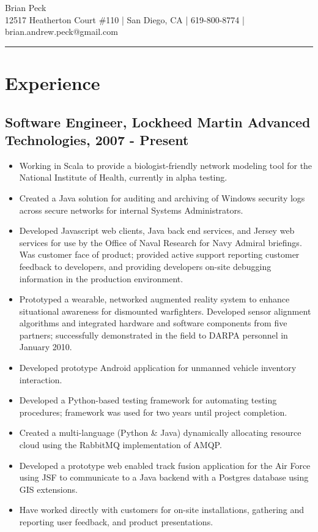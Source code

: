 \documentclass[11pt]{article}
\title{}
\date{}
\begin{document}
\begin{center}
{\huge Brian Peck} \\
12517 Heatherton Court \#110 | San Diego, CA | 619-800-8774 | brian.andrew.peck@gmail.com
\hrule
\end{center}

\section*{Experience}
\label{sec-1}

\subsection*{Software Engineer, Lockheed Martin Advanced Technologies, 2007 - Present}
\label{sec-1.1}

\begin{itemize}
\item Working in Scala to provide a biologist-friendly network modeling tool for the National Institute of Health, currently in alpha testing.
\item Created a Java solution for auditing and archiving of Windows security logs across secure networks for internal Systems Administrators.
\item Developed Javascript web clients, Java back end services, and Jersey web services for use by the Office of Naval Research for Navy Admiral briefings.  Was customer face of product; provided active support reporting customer feedback to developers, and providing developers on-site debugging information in the production environment.
\item Prototyped a wearable, networked augmented reality system to enhance situational awareness for dismounted warfighters.  Developed sensor alignment algorithms and integrated hardware and software components from five partners; successfully demonstrated in the field to DARPA personnel in January 2010.
\item Developed prototype Android application for unmanned vehicle inventory interaction.
\item Developed a Python-based testing framework for automating testing procedures; framework was used for two years until project completion.
\item Created a multi-language (Python \& Java) dynamically allocating resource cloud using the RabbitMQ implementation of AMQP.
\item Developed a prototype web enabled track fusion application for the Air Force using JSF to communicate to a Java backend with a Postgres database using GIS extensions.
\item Have worked directly with customers for on-site installations, gathering and reporting user feedback, and product presentations.
\end{itemize}
\end{document}

